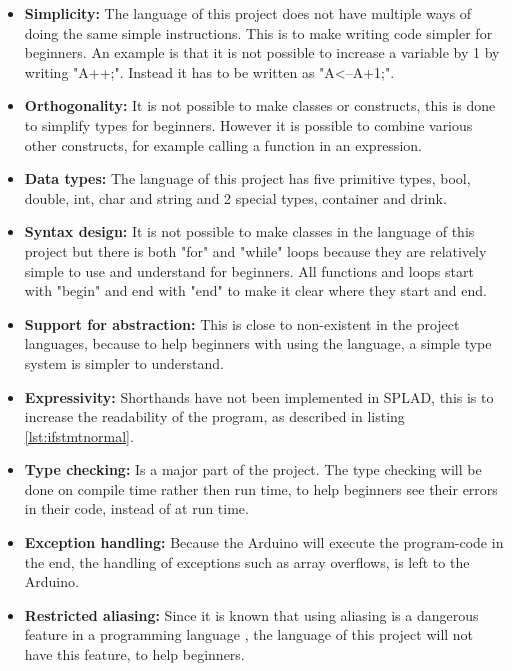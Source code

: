 \begin{itemize}
\item \textbf{Simplicity:} The language of this project does not have multiple ways of doing the same simple instructions. This is to make writing code simpler for beginners. An example is that it is not possible to increase a variable by 1 by writing "A++;". Instead it has to be written as "A<--A+1;".

\item \textbf{Orthogonality:} It is not possible to make classes or constructs, this is done to simplify types for beginners. However it is possible to combine various other constructs, for example calling a function in an expression. 

\item \textbf{Data types:} The language of this project has five primitive types, bool, double, int, char and string and 2 special types, container and drink. 


\item \textbf{Syntax design:} It is not possible to make classes in the language of this project but there is both "for" and "while" loops because they are relatively simple to use and understand for beginners. All functions and loops start with "begin" and end with "end" to make it clear where they start and end.

\item \textbf{Support for abstraction:} This is close to non-existent in the project languages, because to help beginners with using the language, a simple  type system is simpler to understand.
\item \textbf{Expressivity:} Shorthands have not been implemented in SPLAD, this is to increase the readability of the program, as described in listing \ref{lst:ifstmtnormal}.

\item \textbf{Type checking:} Is a major part of the project. The type checking will be done on compile time rather then run time, to help beginners see their errors in their code, instead of at run time.

\item \textbf{Exception handling:} Because the Arduino will execute the program-code in the end, the handling of exceptions such as array overflows, is left to the Arduino.
\item \textbf{Restricted aliasing:} Since it is known that using aliasing is a dangerous feature in a programming language  \citep{sebesta}, the language of this project will not have this feature, to help beginners.
\end{itemize}
